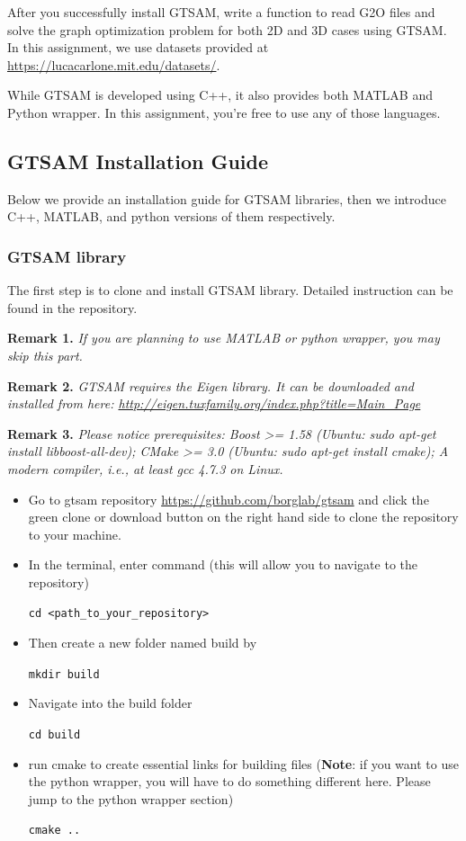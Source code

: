 \documentclass[tp]{lcc}
\begin{document}
After you successfully install GTSAM, write a function to read G2O files and solve the graph optimization problem for both 2D and 3D cases using GTSAM. In this assignment, we use datasets provided at \url{https://lucacarlone.mit.edu/datasets/}.

While GTSAM is developed using C++, it also provides both MATLAB and Python wrapper. In this assignment, you’re free to use any of those languages.

\subsection*{GTSAM Installation Guide}
Below we provide an installation guide for GTSAM libraries, then we introduce C++, MATLAB, and python versions of them respectively.

\subsubsection*{GTSAM library}
The first step is to clone and install GTSAM library. Detailed instruction can be found in the repository.

\textbf{Remark 1.} \textit{If you are planning to use MATLAB or python wrapper, you may skip this part.}

\textbf{Remark 2.} \textit{GTSAM requires the Eigen library. It can be downloaded and installed from here: \url{http://eigen.tuxfamily.org/index.php?title=Main_Page}}

\textbf{Remark 3.} \textit{Please notice prerequisites: Boost >= 1.58 (Ubuntu: sudo apt-get install libboost-all-dev); CMake >= 3.0 (Ubuntu: sudo apt-get install cmake); A modern compiler, i.e., at least gcc 4.7.3 on Linux.}

\begin{itemize}
    \item Go to gtsam repository \url{https://github.com/borglab/gtsam} and click the green clone or download button on the right hand side to clone the repository to your machine.
    \item In the terminal, enter command (this will allow you to navigate to the repository)
    
    \lstinline[style=bash]{cd <path_to_your_repository>}
    
    \item Then create a new folder named build by
    
    \lstinline[style=bash]{mkdir build}
    
    \item Navigate into the build folder
    
    \lstinline[style=bash]{cd build}
    
    \item run cmake to create essential links for building files (\textbf{Note}: if you want to use the python wrapper, you will have to do something different here. Please jump to the python wrapper section)
    
    \lstinline[style=bash]{cmake ..}
\end{itemize}
\end{document}
